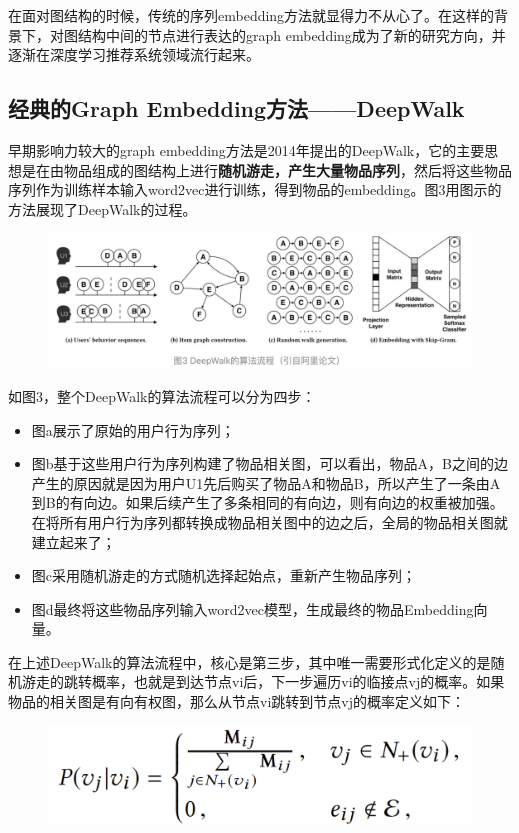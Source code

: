\documentclass[12pt]{article}
\begin{document}
在面对图结构的时候，传统的序列embedding方法就显得力不从心了。在这样的背景下，对图结构中间的节点进行表达的graph embedding成为了新的研究方向，并逐渐在深度学习推荐系统领域流行起来。

\subsection{经典的Graph Embedding方法——DeepWalk}
早期影响力较大的graph embedding方法是2014年提出的DeepWalk，它的主要思想是在由物品组成的图结构上进行\textbf{随机游走，产生大量物品序列}，然后将这些物品序列作为训练样本输入word2vec进行训练，得到物品的embedding。图3用图示的方法展现了DeepWalk的过程。
\begin{figure}[H]
    \centering
    \includegraphics[width=1\textwidth]{fig/Graph_Embedding_Deep_Walk_Example.png}
\end{figure}

如图3，整个DeepWalk的算法流程可以分为四步：
\begin{itemize}
\setlength{\itemsep}{0pt}
\setlength{\parsep}{0pt}
\setlength{\parskip}{0pt}
    \item 图a展示了原始的用户行为序列；
    \item 图b基于这些用户行为序列构建了物品相关图，可以看出，物品A，B之间的边产生的原因就是因为用户U1先后购买了物品A和物品B，所以产生了一条由A到B的有向边。如果后续产生了多条相同的有向边，则有向边的权重被加强。在将所有用户行为序列都转换成物品相关图中的边之后，全局的物品相关图就建立起来了；
    \item 图c采用随机游走的方式随机选择起始点，重新产生物品序列；
    \item 图d最终将这些物品序列输入word2vec模型，生成最终的物品Embedding向量。
\end{itemize}

在上述DeepWalk的算法流程中，核心是第三步，其中唯一需要形式化定义的是随机游走的跳转概率，也就是到达节点vi后，下一步遍历vi的临接点vj的概率。如果物品的相关图是有向有权图，那么从节点vi跳转到节点vj的概率定义如下：
\begin{figure}[H]
    \centering
    \includegraphics[width=.6\textwidth]{fig/Graph_Embedding_Deep_Walk_Trans_Prob.png}
\end{figure}
\end{document}
